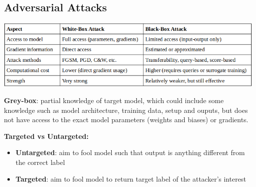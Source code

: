 \subsection{Adversarial Attacks}
\includegraphics[scale =0.25]{contents/imgs/attack_types_new.png}

\textbf{Grey-box}: partial knowledge of target model, which could include some knowledge such as model architecture, training data, setup and ouputs, but does not have access to the exact model parameters (weights and biases) or gradients.

\textbf{Targeted vs Untargeted:}
\begin{itemize}
    \item \textbf{Untargeted}: aim to fool model such that output is anything different from the correct label
    \item \textbf{Targeted}: aim to fool model to return target label of the attacker's interest
\end{itemize}

